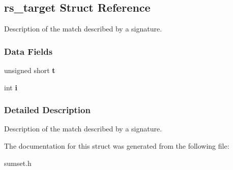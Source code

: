 \hypertarget{structrs__target}{
\subsection{rs\_\-target Struct Reference}
\label{structrs__target}
}
Description of the match described by a signature.  


\subsubsection*{Data Fields}
\begin{CompactItemize}
\item 
\hypertarget{structrs__target_b784363682dea3aa8c8e0e7ec58c93a4}{
unsigned short \textbf{t}}
\label{structrs__target_b784363682dea3aa8c8e0e7ec58c93a4}

\item 
\hypertarget{structrs__target_841a5e820b020aac4586f2014b7a3f7d}{
int \textbf{i}}
\label{structrs__target_841a5e820b020aac4586f2014b7a3f7d}

\end{CompactItemize}


\subsubsection{Detailed Description}
Description of the match described by a signature. 

The documentation for this struct was generated from the following file:\begin{CompactItemize}
\item 
sumset.h\end{CompactItemize}

